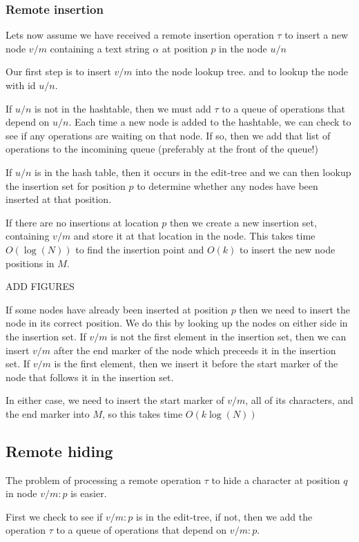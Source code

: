 \documentclass{amsart}
\begin{document}
\subsubsection{Remote insertion}
Lets now assume we have received a remote insertion operation $\tau$
to insert a new node $v/m$ containing a text string $\alpha$  
at position $p$ 
in the node $u/n$

Our first step is to insert $v/m$ into the node lookup tree.
and to lookup the node with id $u/n$. 

If $u/n$ is not in the hashtable, then we must add $\tau$ to a queue of
operations that depend on $u/n$.
Each time a new node is added to the hashtable, we can check to see if any
operations are waiting on that node. If so, then we add that list of operations
to the incomining queue (preferably at the front of the queue!)

If $u/n$ is in the hash table, then it occurs 
in the edit-tree and we can then lookup the insertion set
for position $p$ to determine whether 
any nodes have been inserted at that position.

If there are no insertions at location $p$
then we create a new insertion set, containing $v/m$ and
store it at that location in the node.
This takes time $O(\log(N))$ to find the insertion point
and $O(k)$ to insert the new node positions in $M$.

ADD FIGURES

If some nodes have already been inserted at position $p$ then we need to insert the
node in its correct position. We do this by looking up the nodes on either 
side in the insertion set. If $v/m$ is not the first element in
the insertion set, then we can insert $v/m$ after the end marker of the node
which preceeds it in the insertion set. If $v/m$ is the first element,
then we insert it before the start marker of the node that follows it in
the insertion set.

In either case, we need to insert the start marker of $v/m$, all of its
characters, and the end marker into $M$, so this takes time $O(k\log(N))$


\subsection{Remote hiding}
The problem of processing a remote operation $\tau$ to hide 
a character at position $q$ in node $v/m:p$ is easier.

First we check to see if $v/m:p$ is in the edit-tree, if not, then we
add the operation $\tau$ to a queue of operations that depend on $v/m:p$.
\end{document}
